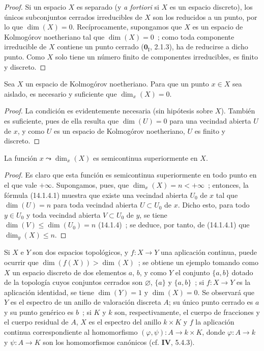 \begin{proof}
Si un espacio $X$ es separado (y \emph{a fortiori} si $X$ es un espacio
discreto), los únicos subconjuntos cerrados irreducibles de $X$ son los
reducidos a un punto, por lo que $\dim(X)=0$. Recíprocamente, supongamos que
$X$ es un espacio de Kolmogórov noetheriano tal que $\dim(X)=0$~; como toda
componente irreducible de $X$ contiene un punto cerrado ($\mathbf{0}_{\mathrm I}$, 2.1.3),
ha de reducirse a dicho punto. Como $X$ solo tiene un número finito de
componentes irreducibles, es finito y discreto.
\end{proof}

\begin{corollary}[14.1.10]
\label{0.14.1.10-fr}
Sea $X$ un espacio de Kolmogórov noetheriano. Para que un punto $x\in X$ sea
aislado, es necesario y suficiente que $\dim_x(X)=0$.
\end{corollary}

\begin{proof}
La condición es evidentemente necesaria (sin hipótesis sobre $X$). También es
suficiente,
pues de ella resulta que $\dim(U)=0$ para una vecindad abierta $U$ de $x$, y
como $U$ es un espacio de Kolmogórov noetheriano, $U$ es finito y discreto.
\end{proof}

\begin{proposition}[14.1.11]
\label{0.14.1.11-fr}
La función $x\leadsto\dim_x(X)$ es semicontinua superiormente en $X$.
\end{proposition}

\begin{proof}
Es claro que esta función es semicontinua superiormente en todo
punto en el que vale $+\infty$. Supongamos, pues, que $\dim_x(X)=n<+\infty$~;
entonces, la fórmula (14.1.4.1) muestra que existe una vecindad abierta $U_0$ de
$x$ tal que $\dim(U)=n$ para toda vecindad abierta $U\subset U_0$ de $x$.
Dicho esto, para todo $y\in U_0$ y toda vecindad abierta $V\subset U_0$ de $y$,
se tiene $\dim(V)\leq\dim(U_0)=n$ (14.1.4)~; se deduce, por tanto, de
(14.1.4.1) que $\dim_y(X)\leq n$.
\end{proof}

\begin{remark}[14.1.12]
\label{0.14.1.12-fr}
Si $X$ e $Y$ son dos espacios topológicos, y $f:X\to Y$ una aplicación
continua, puede ocurrir que $\dim(f(X))>\dim(X)$~; se obtiene un ejemplo tomando
como $X$ un espacio discreto de dos elementos $a$, $b$, y como $Y$ el conjunto
$\{a,b\}$ dotado de la topología cuyos conjuntos cerrados son
$\varnothing$, $\{a\}$ y $\{a,b\}$~; si $f:X\to Y$ es la aplicación
identidad, se tiene $\dim(Y)=1$ y $\dim(X)=0$. Se observará que $Y$ es el espectro
de un anillo de valoración discreta $A$; su único punto cerrado es $a$ y su
punto genérico es $b$~; si $K$ y $k$ son, respectivamente, el cuerpo de
fracciones y el cuerpo residual de $A$, $X$ es el espectro del anillo $k\times K$
y $f$ la aplicación continua correspondiente al homomorfismo
$(\varphi,\psi):A\to k\times K$, donde $\varphi:A\to k$ y $\psi:A\to K$ son
los homomorfismos canónicos (cf. \textbf{IV}, 5.4.3).
\end{remark}

